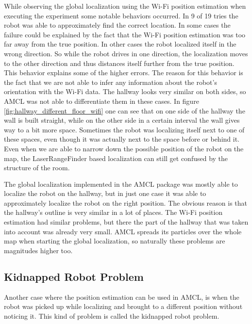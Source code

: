 While observing the global localization using the Wi-Fi position estimation when executing the experiment some notable behaviors occurred. In 9 of 19 tries the robot was able to approximately find the correct location. In some cases the failure could be explained by the fact that the Wi-Fi position estimation was too far away from the true position. In other cases the robot localized itself in the wrong direction. So while the robot drives in one direction, the localization moves to the other direction and thus distances itself further from the true position. This behavior explains some of the higher errors. The reason for this behavior is the fact that we are not able to infer any information about the robot's orientation with the Wi-Fi data. The hallway looks very similar on both sides, so AMCL was not able to differentiate them in these cases. In figure \ref{fig:hallway_different_floor_wifi} one can see that on one side of the hallway the wall is built straight, while on the other side in a certain interval the wall gives way to a bit more space. Sometimes the robot was localizing itself next to one of these spaces, even though it was actually next to the space before or behind it. Even when we are able to narrow down the possible position of the robot on the map, the \gls{LaserRangeFinder} based localization can still get confused by the structure of the room. 

The global localization implemented in the AMCL package was mostly able to localize the robot on the hallway, but in just one case it was able to approximately localize the robot on the right position. The obvious reason is that the hallway's outline is very similar in a lot of places. The Wi-Fi position estimation had similar problems, but there the part of the hallway that was taken into account was already very small. AMCL spreads its particles over the whole map when starting the global localization, so naturally these problems are magnitudes higher too.
\subsection{Kidnapped Robot Problem}
Another case where the position estimation can be used in AMCL, is when the robot was picked up while localizing and brought to a different position without noticing it. This kind of problem is called the kidnapped robot problem. 

